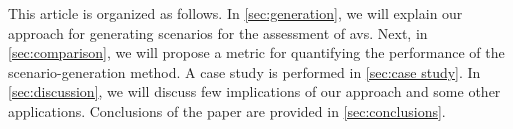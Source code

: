 This article is organized as follows.
In \cref{sec:generation}, we will explain our approach for generating scenarios for the assessment of \acp{av}. 
Next, in \cref{sec:comparison}, we will propose a metric for quantifying the performance of the scenario-generation method.
A case study is performed in \cref{sec:case study}.
In \cref{sec:discussion}, we will discuss few implications of our approach and some other applications.
Conclusions of the paper are provided in \cref{sec:conclusions}.
